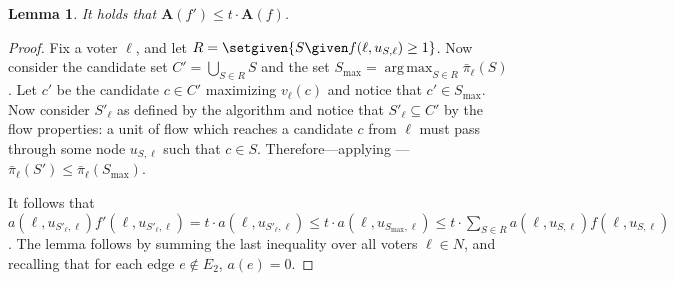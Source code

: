 \documentclass[letterpaper]{article} %
\DeclareMathOperator*{\argmax}{arg\,max}
\newtheorem{lemma}{Lemma}
\newcommand{\vecc}{\mathbf}
\newcommand{\Aoper}[1]{\vecc{A}({#1})}
\begin{document}
\begin{lemma} \label{totalPriceLemma}
It holds that $\Aoper{f'} \leq t \cdot \Aoper{f}$.
\end{lemma}
\begin{proof}
Fix a voter $\ell$, and let $R=\setgiven{S \given  f(\ell, u_{S, \ell})\geq 1}$. Now consider the candidate set $C' = \bigcup_{S \in R}S$ and the set $S_{\max}=\argmax_{S\in R} \bar{\pi}_{\ell}(S)$. Let $c'$ be the candidate $c \in C'$ maximizing $v_\ell(c)$ and notice that $c' \in S_{\max}$. Now consider $S'_{\ell}$ as defined by the algorithm and notice that $S'_{\ell} \subseteq C'$ by the flow properties: a unit of flow which reaches a candidate $c$ from $\ell$ must pass through some node $u_{S,\ell}$ such that $c \in S$. Therefore---applying ---$\bar{\pi}_{\ell}(S') \leq \bar{\pi}_{\ell}(S_{\max})$.

It follows that $a(\ell, u_{S'_\ell, \ell})f'(\ell, u_{S'_\ell, \ell}) =t \cdot a(\ell, u_{S'_\ell, \ell})  \leq t\cdot  a(\ell, u_{S_{\max}, \ell}) \leq
t\cdot \sum_{S \in R}a(\ell, u_{S, \ell}) f(\ell, u_{S, \ell})$.
The lemma follows by summing the last inequality over all voters $\ell \in N$, and recalling that for each edge $e \notin E_2$, $a(e)=0$.
\end{proof}
\end{document}
